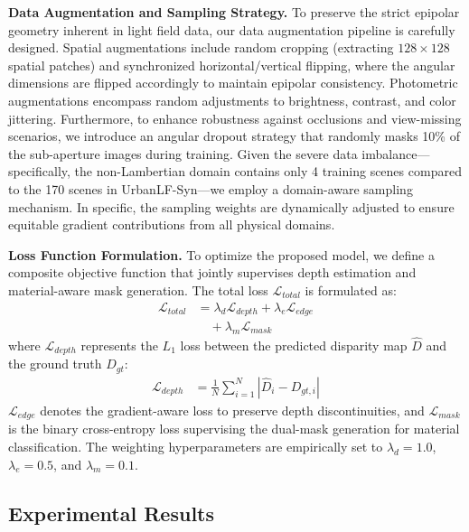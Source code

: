 \documentclass[lettersize,journal]{IEEEtran}
\begin{document}
\textbf{Data Augmentation and Sampling Strategy.} 
To preserve the strict epipolar geometry inherent in light field data, our data augmentation pipeline is carefully designed. Spatial augmentations include random cropping (extracting $128 \times 128$ spatial patches) and synchronized horizontal/vertical flipping, where the angular dimensions are flipped accordingly to maintain epipolar consistency. Photometric augmentations encompass random adjustments to brightness, contrast, and color jittering. Furthermore, to enhance robustness against occlusions and view-missing scenarios, we introduce an angular dropout strategy that randomly masks 10\% of the sub-aperture images during training. Given the severe data imbalance---specifically, the non-Lambertian domain contains only 4 training scenes compared to the 170 scenes in UrbanLF-Syn---we employ a domain-aware sampling mechanism. In specific, the sampling weights are dynamically adjusted to ensure equitable gradient contributions from all physical domains.

\textbf{Loss Function Formulation.}
To optimize the proposed model, we define a composite objective function that jointly supervises depth estimation and material-aware mask generation. The total loss $\mathcal{L}_{total}$ is formulated as:
\begin{equation}
\begin{aligned}
\mathcal{L}_{total} &= \lambda_{d} \mathcal{L}_{depth} + \lambda_{e} \mathcal{L}_{edge} \\
&\quad + \lambda_{m} \mathcal{L}_{mask}
\end{aligned}
\end{equation}
where $\mathcal{L}_{depth}$ represents the $L_1$ loss between the predicted disparity map $\hat{D}$ and the ground truth $D_{gt}$:
\begin{equation}
\begin{aligned}
\mathcal{L}_{depth} &= \frac{1}{N} \sum_{i=1}^{N} | \hat{D}_i - D_{gt, i} |
\end{aligned}
\end{equation}
$\mathcal{L}_{edge}$ denotes the gradient-aware loss to preserve depth discontinuities, and $\mathcal{L}_{mask}$ is the binary cross-entropy loss supervising the dual-mask generation for material classification. The weighting hyperparameters are empirically set to $\lambda_{d}=1.0$, $\lambda_{e}=0.5$, and $\lambda_{m}=0.1$.

\subsection{Experimental Results}
\end{document}
